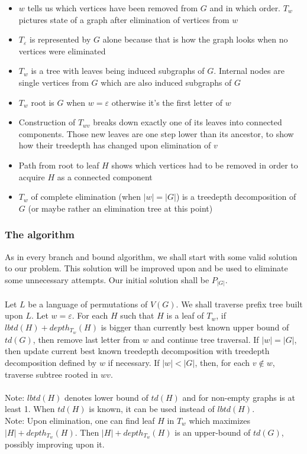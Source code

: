 \begin{itemize}
	\item $w$ tells us which vertices have been removed from $G$ and in which order. $T_w$ pictures state of a graph after elimination of vertices from $w$
	\item $T_\varepsilon$ is represented by $G$ alone because that is how the graph looks when no vertices were eliminated
	\item $T_w$ is a tree with leaves being induced subgraphs of $G$. Internal nodes are single vertices from $G$ which are also induced subgraphs of $G$
	\item $T_w$ root is $G$ when $w=\varepsilon$ otherwise it's the first letter of $w$
	\item Construction of $T_{wv}$ breaks down exactly one of its leaves into connected components. Those new leaves are one step lower than its ancestor, to show how their treedepth has changed upon elimination of $v$
	\item Path from  root to leaf $H$ shows which vertices had to be removed in order to acquire $H$ as a connected component
	\item $T_w$ of complete elimination (when $\left|w\right|=\left|G\right|$) is a treedepth decomposition of $G$ (or maybe rather an elimination tree at this point)
\end{itemize}
\subsubsection{The algorithm}
As in every branch and bound algorithm, we shall start with some valid solution to our problem. This solution will be improved upon and be used to eliminate some unnecessary attempts. Our initial solution shall be $P_{\left|G\right|}$.\\\\
Let $L$ be a language of permutations of $V\left(G\right)$. We shall traverse prefix tree built upon $L$.
Let $w=\varepsilon$. For each $H$ such that $H$ is a leaf of $T_w$, if $lbtd(H)+depth_{T_w}(H)$ is bigger than currently best known upper bound of $td(G)$, then remove last letter from $w$ and continue tree traversal. If $|w|=|G|$, then update current best known treedepth decomposition with treedepth decomposition defined by $w$ if necessary. If $|w|<|G|$, then, for each $v\notin w$, traverse subtree rooted in $wv$.\\\\
Note: $lbtd(H)$ denotes lower bound of $td\left(H\right)$ and for non-empty graphs is at least 1. When $td\left(H\right)$ is known, it can be used instead of $lbtd(H)$.\\
Note: Upon elimination, one can find leaf $H$ in $T_w$ which maximizes $\left|H\right| + depth_{T_w}(H)$. Then $\left|H\right| + depth_{T_w}(H)$ is an upper-bound of $td(G)$, possibly improving upon it.
